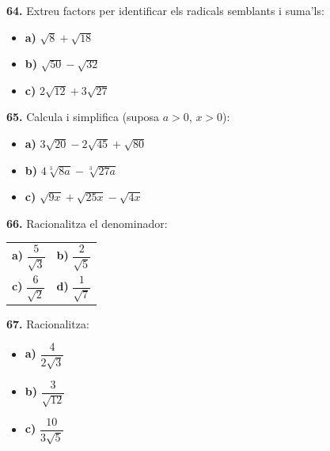 \documentclass[13pt,a4paper]{extarticle}
\begin{document}
\par\noindent\begin{minipage}{\linewidth}
\textbf{64.} Extreu factors per identificar els radicals semblants i suma'ls:\par

\begin{itemize}[leftmargin=0pt,itemsep=3pt,topsep=3pt,parsep=0pt,label={}]
\item \textbf{a)} $\sqrt{8}+\sqrt{18}$
\item \textbf{b)} $\sqrt{50}-\sqrt{32}$
\item \textbf{c)} $2\sqrt{12}+3\sqrt{27}$
\end{itemize}
\end{minipage}\par\vspace{1.6mm}
\par\noindent\begin{minipage}{\linewidth}
\textbf{65.} Calcula i simplifica (suposa $a>0$, $x>0$):\par

\begin{itemize}[leftmargin=0pt,itemsep=3pt,topsep=3pt,parsep=0pt,label={}]
\item \textbf{a)} $3\sqrt{20}-2\sqrt{45}+\sqrt{80}$
\item \textbf{b)} $4\sqrt[3]{8a}-\sqrt[3]{27a}$
\item \textbf{c)} $\sqrt{9x}+\sqrt{25x}-\sqrt{4x}$
\end{itemize}
\end{minipage}\par\vspace{1.6mm}
\par\noindent\begin{minipage}{\linewidth}
\textbf{66.} Racionalitza el denominador:\par

\begin{tabular}{@{}p{.46\linewidth}p{.46\linewidth}@{}}
\textbf{a)} $\dfrac{5}{\sqrt3}$ & \textbf{b)} $\dfrac{2}{\sqrt5}$ \\[2pt]
\textbf{c)} $\dfrac{6}{\sqrt2}$ & \textbf{d)} $\dfrac{1}{\sqrt7}$ \\[2pt]
\end{tabular}\par
\end{minipage}\par\vspace{1.6mm}
\par\noindent\begin{minipage}{\linewidth}
\textbf{67.} Racionalitza:\par

\begin{itemize}[leftmargin=0pt,itemsep=3pt,topsep=3pt,parsep=0pt,label={}]
\item \textbf{a)} $\dfrac{4}{2\sqrt3}$
\item \textbf{b)} $\dfrac{3}{\sqrt{12}}$
\item \textbf{c)} $\dfrac{10}{3\sqrt5}$
\end{itemize}
\end{minipage}\par\vspace{1.6mm}
\end{document}

